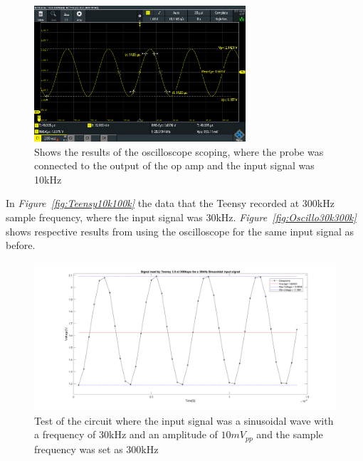\begin{figure}[h]
    \centering
    \includegraphics[width=0.7\textwidth]{graphics/20k10mvPP200ksamp.PNG}
    \caption{Shows the results of the oscilloscope scoping, where the probe was connected to the output of the op amp and the input signal was 10kHz}
    \label{fig:Oscillo20k200k}
\end{figure}

\vspace{4cm}

In \textit{Figure~\ref{fig:Teensy10k100k}} the data that the Teensy recorded at 300kHz sample frequency, where the input signal was 30kHz.
\textit{Figure~\ref{fig:Oscillo30k300k}} shows respective results from using the oscilloscope for the same input signal as before.

\begin{figure}[h]
    \centering
    \includegraphics[width=1.0\textwidth]{graphics/30kin_300ksampl.png}
    \caption{Test of the circuit where the input signal was a sinusoidal wave with a frequency of 30kHz and an amplitude of $10mV_{pp}$ and the sample frequency was set as 300kHz}
    \label{fig:Teensy30k300k}
\end{figure}




